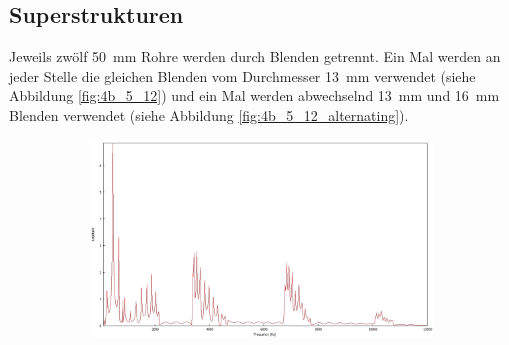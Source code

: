 \subsection{Superstrukturen}
\label{subsec:Superstrukturen}
Jeweils zwölf 50~mm Rohre werden durch Blenden getrennt. 
Ein Mal werden an jeder Stelle die gleichen Blenden vom Durchmesser 13~mm verwendet (siehe Abbildung \ref{fig:4b_5_12}) und ein Mal werden abwechselnd 13~mm und 16~mm Blenden verwendet (siehe Abbildung \ref{fig:4b_5_12_alternating}).
\begin{figure}
\centering
\begin{subfigure}{0.65\textwidth}
\includegraphics[width=\textwidth]{content/messungen/Chapter4b/4b_5_12_13.jpg}
\end{subfigure}
\begin{subfigure}{0.34\textwidth}

\end{subfigure}
\end{figure}
